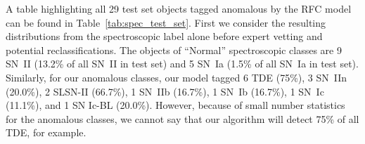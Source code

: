 \documentclass[twocolumn]{aastex63}
\begin{document}
A table highlighting all 29 test set objects tagged anomalous by the RFC model can be found in Table~\ref{tab:spec_test_set}. First we consider the resulting distributions from the spectroscopic label alone before expert vetting and potential reclassifications. The objects of ``Normal'' spectroscopic classes are 9 SN~II (13.2\% of all SN~II in test set) and 5 SN~Ia (1.5\% of all SN~Ia in test set). Similarly, for our anomalous classes, our model tagged 6 TDE (75\%), 3 SN~IIn (20.0\%), 2 SLSN-II (66.7\%), 1 SN~IIb (16.7\%), 1 SN~Ib (16.7\%), 1 SN~Ic (11.1\%), and 1 SN Ic-BL (20.0\%). However, because of small number statistics for the anomalous classes, we cannot say that our algorithm will detect 75\% of all TDE, for example. \par


\end{document}
